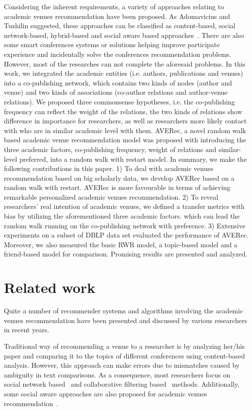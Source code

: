 \documentclass[9pt]{acm_proc_article-sp}
\begin{document}
Considering the inherent requirements, a variety of approaches relating to academic venues recommendation have been proposed. As Adomavicius and Tuzhilin suggested, these approaches can be classified as content-based, social network-based, hybrid-based and social aware based approaches~\cite{adomavicius2005toward}. There are also some smart conferences systems or solutions helping improve participate experience and incidentally solve the conferences recommendation problems. However, most of the researches can not complete the aforesaid problems. In this work, we integrated the academic entities (i.e. authors, publications and venues) into a co-publishing network, which contains two kinds of nodes (author and venue) and two kinds of associations (co-author relations and author-venue relations). We proposed three commonsense  hypotheses, i.e. the co-publishing frequency can reflect the weight of the relations, the two kinds of relations show difference in importance for researchers, as well as researchers more likely contact with who are in similar academic level with them. AVERec, a novel random walk based academic venue recommendation model was proposed with introducing the three academic factors, co-publishing frequency, weight of relations and similar-level preferred, into a random walk with restart model. In summary, we make the following contributions in this paper. 1) To deal with academic venues recommendation based on big scholarly data, we develop AVERec based on a random walk with restart. AVERec is more favourable in terms of achieving remarkable personalized academic venues recommendation. 2) To reveal researchers' real intention of academic venues, we defined a transfer metrics with bias by utilizing the aforementioned three academic factors. which can lead the random walk running on the co-publishing network with preference. 3) Extensive experiments on a subset of DBLP data set evaluated the performance of AVERec. Moreover, we also measured the basic RWR model, a topic-based model and a friend-based model for comparison. Promising results are presented and analyzed.

\section{Related work}
Quite a number of recommender systems and algorithms involving the academic venues recommendation have been presented and discussed by various researchers in recent years.

Traditional way of recommending a venue to a researcher is by analyzing her/his paper and comparing it to the topics of different conferences using content-based analysis. However, this approach can make errors due to mismatches caused by ambiguity in text comparisons. As a consequence, most researchers focus on social network based~\cite{luong2012publication,chen2012social} and collaborative filtering based~\cite{pham2011clustering,yang2012venue} methods. Additionally, some social aware approaches are also proposed for academic venues recommendation~\cite{asabere2014improving,xia2013socially,hornick2012extending}.
\end{document}

